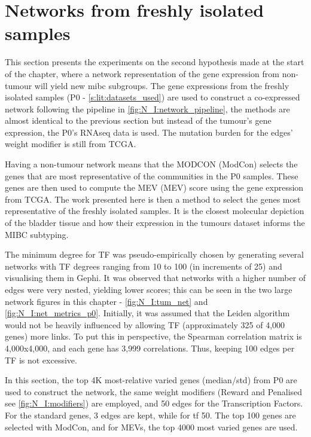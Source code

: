 \section{Networks from freshly isolated samples} \label{s:p0}

This section presents the experiments on the second hypothesis made at the start of the chapter, where a network representation of the gene expression from non-tumour will yield new \acrlong{mibc} subgroups. The gene expressions from the freshly isolated samples (P0 - \cref{s:lit:datasets_used}) are used to construct a co-expressed network following the pipeline in \cref{fig:N_I:network_pipeline}, the methods are almost identical to the previous section but instead of the tumour's gene expression, the P0's RNAseq data is used. The mutation burden for the edges' weight modifier is still from TCGA. 

Having a non-tumour network means that the \gls{MODCON} (ModCon) selects the genes that are most representative of the communities in the P0 samples. These genes are then used to compute the \gls{MEV} (MEV) score using the gene expression from TCGA. The work presented here is then a method to select the genes most representative of the freshly isolated samples. It is the closest molecular depiction of the bladder tissue and how their expression in the tumours dataset informs the MIBC subtyping.

The minimum degree for TF was pseudo-empirically chosen by generating several networks with TF degrees ranging from 10 to 100 (in increments of 25) and visualising them in Gephi. It was observed that networks with a higher number of edges were very nested, yielding lower scores; this can be seen in the two large network figures in this chapter - \cref{fig:N_I:tum_net} and \cref{fig:N_I:net_metrics_p0}. Initially, it was assumed that the Leiden algorithm would not be heavily influenced by allowing TF (approximately 325 of 4,000 genes) more links. To put this in perspective, the Spearman correlation matrix is 4,000x4,000, and each gene has 3,999 correlations. Thus, keeping 100 edges per TF is not excessive.

In this section, the top 4K most-relative varied genes (median/std) from P0 are used to construct the network, the same weight modifiers (Reward and Penalised see \cref{fig:N_I:modifiers}) are employed, and 50 edges for the Transcription Factors. For the standard genes, 3 edges are kept, while for \acrlong{tf} 50. The top 100 genes are selected with ModCon, and for MEVs, the top 4000 most varied genes are used.

